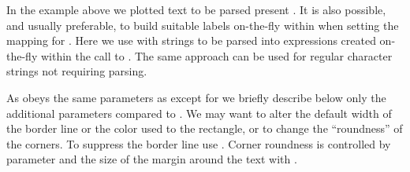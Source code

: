 \documentclass[krantz2]{krantz}\usepackage{knitr}%
\begin{document}
In the example above we plotted text to be parsed present . It is also possible, and usually preferable, to build suitable labels on-the-fly within  when setting the mapping for . Here we use  with strings to be parsed into expressions created on-the-fly within the call to . The same approach can be used for regular character strings not requiring parsing.

\begin{knitrout}\footnotesize
{}\color{fgcolor}\begin{kframe}
\begin{alltt}
   \hlstd{=} \hlstd{(}\hlstr{"alpha["} \hlstr{"]"}\hlstd{,}  \hlstd{=} \hlstd{)))} \hlopt{+}
  \hlstd{(} \hlstd{=} \hlopt{-}\hlstd{,}  \hlstd{=} \hlstd{,}  \hlstd{=} \hlstd{)} \hlopt{+}
  \hlstd{()}
\end{alltt}
\end{kframe}
\end{knitrout}

As  obeys the same parameters as  except for  we briefly describe below only the additional parameters compared to . We may want to alter the default width of the border line or the color used to  the rectangle, or to change the ``roundness'' of the corners. To suppress the border line use . Corner roundness is controlled by parameter  and the size of the margin around the text with .
\end{document}
